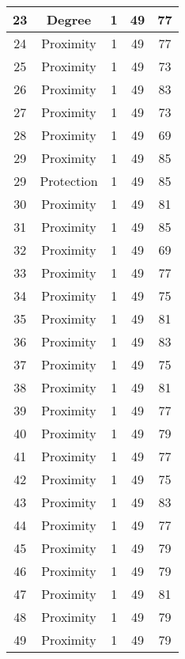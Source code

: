 \documentclass[results.tex]{subfiles}
\begin{document}
\begin{center}
\begin{tabular}{| c || c | c | c | c |}
    \hline
    23 & Degree & 1 & 49 & 77 \\ 
    \hline
    24 & Proximity & 1 & 49 & 77 \\ 
    \hline
    25 & Proximity & 1 & 49 & 73 \\ 
    \hline
    26 & Proximity & 1 & 49 & 83 \\ 
    \hline
    27 & Proximity & 1 & 49 & 73 \\ 
    \hline
    28 & Proximity & 1 & 49 & 69 \\ 
    \hline
    29 & Proximity & 1 & 49 & 85 \\ 
    \hline
    29 & Protection & 1 & 49 & 85 \\ 
    \hline
    30 & Proximity & 1 & 49 & 81 \\ 
    \hline
    31 & Proximity & 1 & 49 & 85 \\ 
    \hline
    32 & Proximity & 1 & 49 & 69 \\ 
    \hline
    33 & Proximity & 1 & 49 & 77 \\ 
    \hline
    34 & Proximity & 1 & 49 & 75 \\ 
    \hline
    35 & Proximity & 1 & 49 & 81 \\ 
    \hline
    36 & Proximity & 1 & 49 & 83 \\ 
    \hline
    37 & Proximity & 1 & 49 & 75 \\ 
    \hline
    38 & Proximity & 1 & 49 & 81 \\ 
    \hline
    39 & Proximity & 1 & 49 & 77 \\ 
    \hline
    40 & Proximity & 1 & 49 & 79 \\ 
    \hline
    41 & Proximity & 1 & 49 & 77 \\ 
    \hline
    42 & Proximity & 1 & 49 & 75 \\ 
    \hline
    43 & Proximity & 1 & 49 & 83 \\ 
    \hline
    44 & Proximity & 1 & 49 & 77 \\ 
    \hline
    45 & Proximity & 1 & 49 & 79 \\ 
    \hline
    46 & Proximity & 1 & 49 & 79 \\ 
    \hline
    47 & Proximity & 1 & 49 & 81 \\ 
    \hline
    48 & Proximity & 1 & 49 & 79 \\ 
    \hline
    49 & Proximity & 1 & 49 & 79 \\ 
    \hline   \end{tabular}
\end{center}
\end{document}
